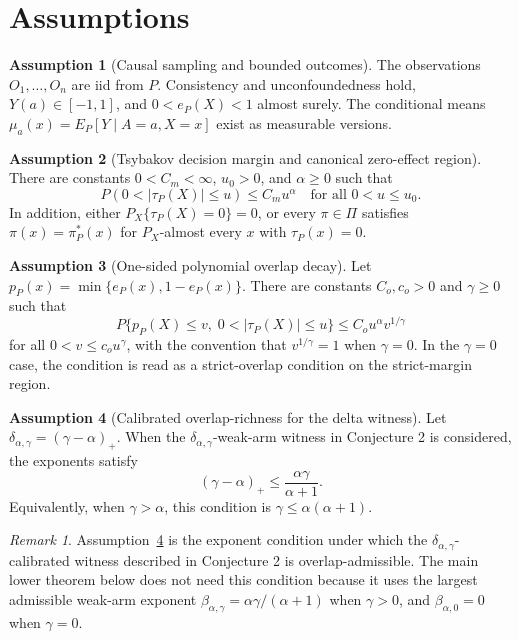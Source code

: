\documentclass[11pt]{article}
\theoremstyle{definition}
\newtheorem{assumption}{Assumption}
\theoremstyle{plain}
\theoremstyle{remark}
\newtheorem{remark}{Remark}
\begin{document}
\section{Assumptions}
\begin{assumption}[Causal sampling and bounded outcomes]\label{ass:causal-sampling}
The observations \(O_1,\ldots,O_n\) are iid from \(P\).  Consistency and
unconfoundedness hold, \(Y(a)\in[-1,1]\), and \(0<e_P(X)<1\) almost surely.
The conditional means \(\mu_a(x)=E_P[Y\mid A=a,X=x]\) exist as measurable
versions.
\end{assumption}

\begin{assumption}[Tsybakov decision margin and canonical zero-effect region]\label{ass:margin}
There are constants \(0<C_m<\infty\), \(u_0>0\), and \(\alpha\ge0\) such that
\[
P(0<|\tau_P(X)|\le u)\le C_m u^\alpha
\quad\text{for all }0<u\le u_0.
\]
In addition, either \(P_X\{\tau_P(X)=0\}=0\), or every
\(\pi\in\Pi\) satisfies \(\pi(x)=\pi_P^*(x)\) for \(P_X\)-almost every
\(x\) with \(\tau_P(x)=0\).
\end{assumption}

\begin{assumption}[One-sided polynomial overlap decay]\label{ass:overlap-decay}
Let \(p_P(x)=\min\{e_P(x),1-e_P(x)\}\).  There are constants
\(C_o,c_o>0\) and \(\gamma\ge0\) such that
\[
P\{p_P(X)\le v,\;0<|\tau_P(X)|\le u\}
  \le C_o u^\alpha v^{1/\gamma}
\]
for all \(0<v\le c_o u^\gamma\), with the convention that \(v^{1/\gamma}=1\)
when \(\gamma=0\).  In the \(\gamma=0\) case, the condition is read as a
strict-overlap condition on the strict-margin region.
\end{assumption}

\begin{assumption}[Calibrated overlap-richness for the delta witness]\label{ass:calibrated-overlap-richness}
Let \(\delta_{\alpha,\gamma}=(\gamma-\alpha)_+\).  When the
\(\delta_{\alpha,\gamma}\)-weak-arm witness in Conjecture 2 is considered,
the exponents satisfy
\[
(\gamma-\alpha)_+
\le \frac{\alpha\gamma}{\alpha+1}.
\]
Equivalently, when \(\gamma>\alpha\), this condition is
\(\gamma\le\alpha(\alpha+1)\).
\end{assumption}

\begin{remark}
Assumption~\ref{ass:calibrated-overlap-richness} is the exponent condition
under which the \(\delta_{\alpha,\gamma}\)-calibrated witness described in
Conjecture 2 is overlap-admissible.  The main lower theorem below does not
need this condition because it uses the largest admissible weak-arm exponent
\(\beta_{\alpha,\gamma}=\alpha\gamma/(\alpha+1)\) when \(\gamma>0\), and
\(\beta_{\alpha,0}=0\) when \(\gamma=0\).
\end{remark}
\end{document}
